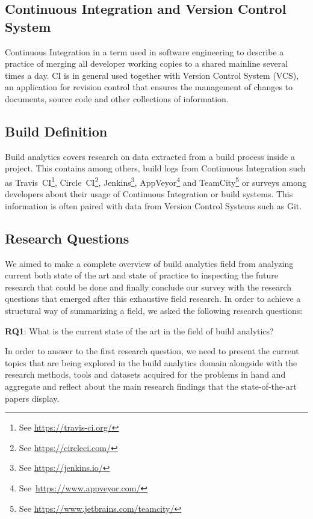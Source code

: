 \documentclass[]{book}
\let\rmarkdownfootnote\footnote%
\def\footnote{\protect\rmarkdownfootnote}
\begin{document}
\subsection{Continuous Integration and Version Control
System}\label{continuous-integration-and-version-control-system}

Continuous Integration in a term used in software engineering to
describe a practice of merging all developer working copies to a shared
mainline several times a day. CI is in general used together with
Version Control System (VCS), an application for revision control that
ensures the management of changes to documents, source code and other
collections of information.

\subsection{Build Definition}\label{build-definition}

Build analytics covers research on data extracted from a build process
inside a project. This contains among others, build logs from Continuous
Integration such as Travis~CI\footnote{See \url{https://travis-ci.org/}},
Circle~CI\footnote{See \url{https://circleci.com/}}, Jenkins\footnote{See
  \url{https://jenkins.io/}}, AppVeyor\footnote{See~\url{https://www.appveyor.com/}}
and TeamCity\footnote{See \url{https://www.jetbrains.com/teamcity/}} or
surveys among developers about their usage of Continuous Integration or
build systems. This information is often paired with data from Version
Control Systems such as Git.

\subsection{Research Questions}\label{research-questions}

We aimed to make a complete overview of build analytics field from
analyzing current both state of the art and state of practice to
inspecting the future research that could be done and finally conclude
our survey with the research questions that emerged after this
exhaustive field research. In order to achieve a structural way of
summarizing a field, we asked the following research questions:

\textbf{RQ1}: What is the current state of the art in the field of build
analytics?

In order to answer to the first research question, we need to present
the current topics that are being explored in the build analytics domain
alongside with the research methods, tools and datasets acquired for the
problems in hand and aggregate and reflect about the main research
findings that the state-of-the-art papers display.
\end{document}
